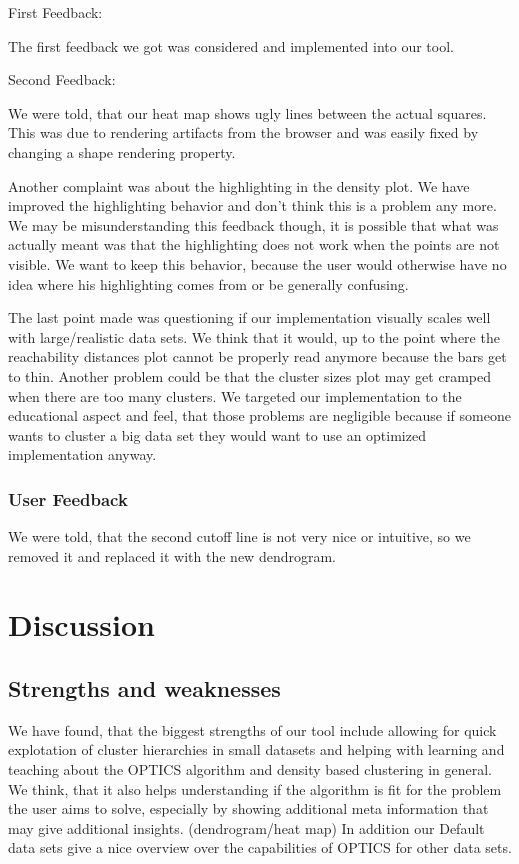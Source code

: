 \documentclass{vgtc} %
\begin{document}
First Feedback:

The first feedback we got was considered and implemented into our tool.

\noindent Second Feedback:

We were told, that our heat map shows ugly lines between the actual squares. This was due to rendering artifacts from the browser and was easily fixed by changing a shape rendering property.

Another complaint was about the highlighting in the density plot. We have improved the highlighting behavior and don't think this is a problem any more. We may be misunderstanding this feedback though, it is possible that what was actually meant was that the highlighting does not work when the points are not visible. We want to keep this behavior, because the user would otherwise have no idea where his highlighting comes from or be generally confusing.

The last point made was questioning if our implementation visually scales well with large/realistic data sets. We think that it would, up to the point where the reachability distances plot cannot be properly read anymore because the bars get to thin. Another problem could be that the cluster sizes plot may get cramped when there are too many clusters. We targeted our implementation to the educational aspect and feel, that those problems are negligible because if someone wants to cluster a big data set they would want to use an optimized implementation anyway.

\subsubsection{User Feedback}
We were told, that the second cutoff line is not very nice or intuitive, so we removed it and replaced it with the new dendrogram.

\section{Discussion}

\subsection{Strengths and weaknesses}
We have found, that the biggest strengths of our tool include allowing for quick explotation of cluster hierarchies in small datasets and helping with learning and teaching about the OPTICS algorithm and density based clustering in general. We think, that it also helps understanding if the algorithm is fit for the problem the user aims to solve, especially by showing additional meta information that may give additional insights. (dendrogram/heat map) In addition our Default data sets give a nice overview over the capabilities of OPTICS for other data sets.
\end{document}
